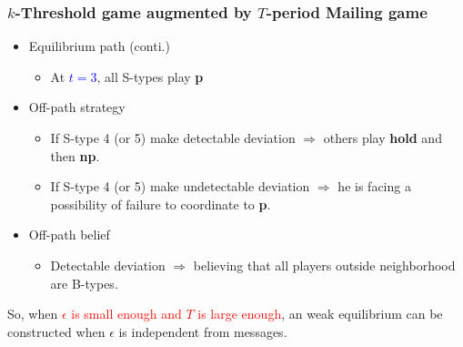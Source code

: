 \documentclass[9pt]{beamer}
\begin{document}
\begin{frame}
  \frametitle{$k$-Threshold game augmented by $T$-period Mailing game}


\begin{itemize}
\item Equilibrium path (conti.)
\begin{itemize}
\item At \textcolor{blue}{$t=3$}, all S-types play \textbf{p}
\end{itemize}
\item Off-path strategy
\begin{itemize}
\item If S-type 4 (or 5) make detectable deviation $\Rightarrow$ others play \textbf{hold} and then \textbf{np}.
\item If S-type 4 (or 5) make undetectable deviation $\Rightarrow$ he is facing a possibility of failure to coordinate to \textbf{p}.
\end{itemize}
\item Off-path belief
\begin{itemize}
\item Detectable deviation $\Rightarrow$ believing that all players outside neighborhood are B-types. 
\end{itemize}
\end{itemize}
\pause
\alert{So}, when \textcolor{red}{$\epsilon$ is small enough and $T$ is large enough}, an weak equilibrium can be constructed \alert{when $\epsilon$ is independent from messages}.


\end{frame}
\end{document}
